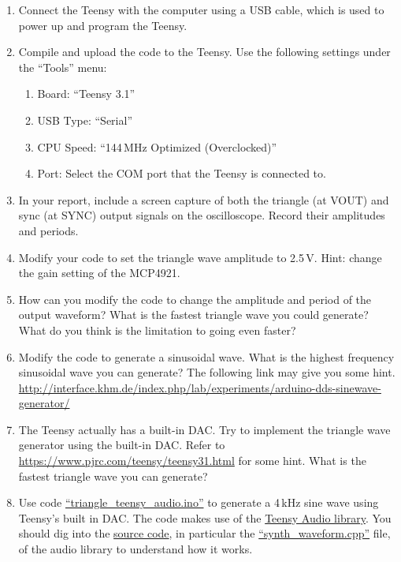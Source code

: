 \documentclass[letterpaper, 11pt]{article}
\begin{document}
\begin{enumerate}
\item Connect the Teensy with the computer using a USB cable, which is used to power up and program the Teensy.

\item Compile and upload the code to the Teensy. Use the following settings under the ``Tools'' menu: 
	\begin{enumerate}
		\item Board: ``Teensy 3.1''
		\item USB Type: ``Serial''
		\item CPU Speed: ``144\,MHz Optimized (Overclocked)''
		\item Port: Select the COM port that the Teensy is connected to. 
	\end{enumerate}

\item In your report, include a screen capture of both the triangle (at VOUT) and sync (at SYNC) output signals on the oscilloscope. Record their amplitudes and periods.

\item Modify your code to set the triangle wave amplitude to 2.5\,V. Hint: change the gain setting of the MCP4921. 

\item How can you modify the code to change the amplitude and period of the output waveform? What is the fastest triangle wave you could generate? What do you think is the limitation to going even faster?

\item Modify the code to generate a sinusoidal wave. What is the highest frequency sinusoidal wave you can generate? The following link may give you some hint. 
\url{http://interface.khm.de/index.php/lab/experiments/arduino-dds-sinewave-generator/} 


\item The Teensy actually has a built-in DAC. Try to implement the triangle wave generator using the built-in DAC. Refer to \url{https://www.pjrc.com/teensy/teensy31.html} for some hint. What is the fastest triangle wave you can generate?

\item Use code \href{https://github.com/ucdart/UCD-EEC134/blob/master/labs/lab1/code/triangle_teensy_audio/triangle_teensy_audio.ino}{``triangle\_teensy\_audio.ino''} to generate a 4\,kHz sine wave using Teensy's built in DAC. The code makes use of the \href{http://www.pjrc.com/teensy/td_libs_Audio.html}{Teensy Audio library}. You should dig into the \href{https://github.com/PaulStoffregen/Audio}{source code}, in particular the \href{https://github.com/PaulStoffregen/Audio/blob/master/synth_waveform.cpp}{``synth\_waveform.cpp''} file, of the audio library to understand how it works. 
\end{enumerate}
\end{document}
